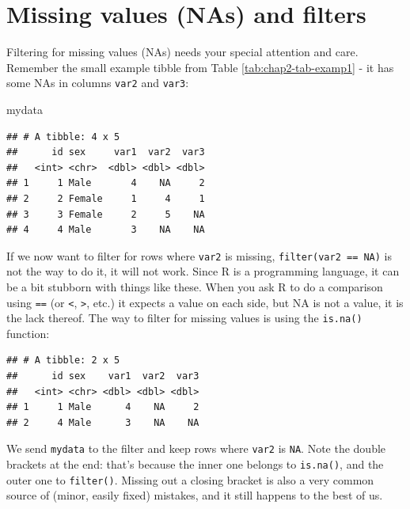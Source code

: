 \documentclass[12pt,]{krantz}
\makeatletter
\newenvironment{Shaded}{\begin{snugshade}}{\end{snugshade}}
\newcommand{\KeywordTok}[1]{\textcolor[rgb]{0.13,0.29,0.53}{\textbf{#1}}}
\newcommand{\NormalTok}[1]{#1}
\newcommand{\OperatorTok}[1]{\textcolor[rgb]{0.81,0.36,0.00}{\textbf{#1}}}
\newcommand{\StringTok}[1]{\textcolor[rgb]{0.31,0.60,0.02}{#1}}
\newenvironment{kframe}{%
\medskip{}
\setlength{\fboxsep}{.8em}
 \def\at@end@of@kframe{}%
 \ifinner\ifhmode%
  \def\at@end@of@kframe{\end{minipage}}%
  \begin{minipage}{\columnwidth}%
 \fi\fi%
 \def\FrameCommand##1{\hskip\@totalleftmargin \hskip-\fboxsep
 \colorbox{shadecolor}{##1}\hskip-\fboxsep
     \hskip-\linewidth \hskip-\@totalleftmargin \hskip\columnwidth}%
 \MakeFramed {\advance\hsize-\width
   \@totalleftmargin\z@ \linewidth\hsize
   \@setminipage}}%
 {\par\unskip\endMakeFramed%
 \at@end@of@kframe}
\renewenvironment{Shaded}{\begin{kframe}}{\end{kframe}}
\theoremstyle{definition}
\theoremstyle{definition}
\theoremstyle{definition}
\theoremstyle{remark}
\makeatother
\begin{document}
\hypertarget{missing-values-nas-and-filters}{%
\section{Missing values (NAs) and
filters}\label{missing-values-nas-and-filters}}

Filtering for missing values (NAs) needs your special attention and
care. Remember the small example tibble from Table
\ref{tab:chap2-tab-examp1} - it has some NAs in columns \texttt{var2}
and \texttt{var3}:

\begin{Shaded}
\begin{Highlighting}[]
\NormalTok{mydata}
\end{Highlighting}
\end{Shaded}

\begin{verbatim}
## # A tibble: 4 x 5
##      id sex     var1  var2  var3
##   <int> <chr>  <dbl> <dbl> <dbl>
## 1     1 Male       4    NA     2
## 2     2 Female     1     4     1
## 3     3 Female     2     5    NA
## 4     4 Male       3    NA    NA
\end{verbatim}

If we now want to filter for rows where \texttt{var2} is missing,
\texttt{filter(var2\ ==\ NA)} is not the way to do it, it will not work.
Since R is a programming language, it can be a bit stubborn with things
like these. When you ask R to do a comparison using \texttt{==} (or
\texttt{\textless{}}, \texttt{\textgreater{}}, etc.) it expects a value
on each side, but NA is not a value, it is the lack thereof. The way to
filter for missing values is using the \texttt{is.na()} function:

\begin{Shaded}
\end{Shaded}

\begin{verbatim}
## # A tibble: 2 x 5
##      id sex    var1  var2  var3
##   <int> <chr> <dbl> <dbl> <dbl>
## 1     1 Male      4    NA     2
## 2     4 Male      3    NA    NA
\end{verbatim}

We send \texttt{mydata} to the filter and keep rows where \texttt{var2}
is \texttt{NA}. Note the double brackets at the end: that's because the
inner one belongs to \texttt{is.na()}, and the outer one to
\texttt{filter()}. Missing out a closing bracket is also a very common
source of (minor, easily fixed) mistakes, and it still happens to the
best of us.
\end{document}
